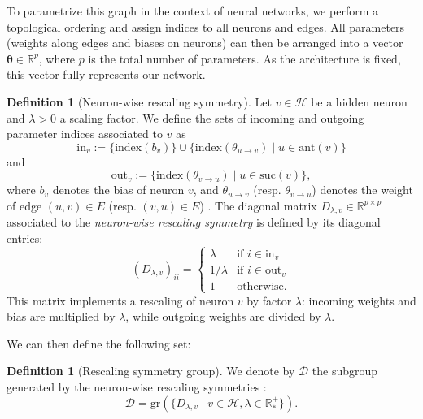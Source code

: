 \documentclass{article}
\theoremstyle{plain}
\theoremstyle{definition}
\newtheorem{definition}[theorem]{Definition}
\theoremstyle{remark}
\def\Dcal{\mathcal{D}}
\def\R{{\mathbb{R}}}
\def\Dcal{{\mathcal{D}}}
\begin{document}
{To parametrize this graph in the context of neural networks, we perform a topological ordering \citep{cormen2022introduction} and assign indices to all neurons and edges. All parameters (weights along edges and biases on neurons) can then be arranged into a vector $\boldsymbol{\theta} \in \mathbb{R}^p$, where $p$ is the total number of parameters. As the architecture is fixed, this vector fully represents our network.

\begin{definition}[Neuron-wise rescaling symmetry]
\label{def:neur_resc}
Let $v \in \mathcal{H}$ be a hidden neuron and $\lambda > 0$ a scaling factor. 
We define the sets of incoming and outgoing parameter indices associated to $v$ as
\begin{equation}
    \mathrm{in}_v := \{\text{index}(b_v)\} \cup \{\text{index}(\theta_{u \rightarrow v}) \mid u \in \text{ant}(v)\}
\end{equation}
and
\begin{equation}
    \mathrm{out}_v := \{\text{index}(\theta_{v \rightarrow u}) \mid u \in \text{suc}(v)\},
\end{equation}
where $b_v$ denotes the bias of neuron $v$, and $\theta_{u \rightarrow v}$ (resp. $\theta_{v \rightarrow u}$) denotes the weight of edge $(u,v) \in E$ (resp. $(v,u) \in E$) \citep[Definition 2.2.2]{gonon2024harnessing}.
The diagonal matrix $D_{\lambda,v} \in \mathbb{R}^{p \times p}$ associated to the \textit{neuron-wise rescaling symmetry} \citep[Def. 2.3]{stock2023embedding} is defined by its diagonal entries:
\begin{equation}
    (D_{\lambda, v})_{ii} = \begin{cases}
        \lambda & \text{if } i \in \mathrm{in}_v\\
        1/\lambda & \text{if } i \in \mathrm{out}_v\\
        1 & \text{otherwise}.
    \end{cases}
\end{equation}
This matrix implements a rescaling of neuron $v$ by factor $\lambda$: incoming weights and bias are multiplied by $\lambda$, while outgoing weights are divided by $\lambda$.
\end{definition}

We can then define the following set:

\begin{definition}[Rescaling symmetry group]
\label{def:dcal}
We denote by $\Dcal$ the subgroup generated by the neuron-wise rescaling symmetries \citep[Def. 2.3]{stock2023embedding}:
\begin{equation}
\Dcal = \text{gr}\left(\{D_{\lambda,v} \mid v \in \mathcal{H}, \lambda \in \R_*^{+}\}\right).
\end{equation}
\end{definition}

}
\end{document}
